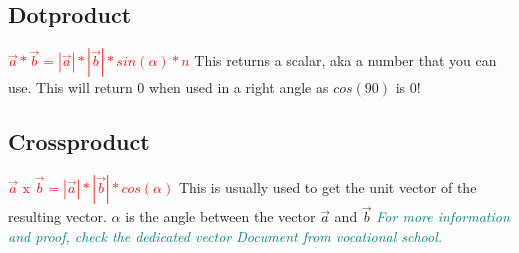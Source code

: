 \documentclass[main.tex,fontsize=8pt,paper=a4,paper=portrait,DIV=calc,]{scrartcl}
\begin{document}
\subsection{Dotproduct}
\Large{\textbf{\textcolor{red}{\( \vec{a} * \vec{b} = |\vec{a}| * |\vec{b}| * sin(\alpha) * n \)}}}\newline
\normalsize This returns a scalar, aka a number that you can use.\newline
This will return 0 when used in a right angle as \(cos(90)\) is 0!\\
\subsection{Crossproduct}
\Large{\textbf{\textcolor{red}{\( \vec{a} \text{ x } \vec{b} = |\vec{a}| * |\vec{b}| * cos(\alpha) \)}}}\newline
\normalsize This is usually used to get the unit vector of the resulting vector.\newline
\(\alpha\) is the angle between the vector \(\vec{a}\) and \(\vec{b}\)\newline
\emph{\textcolor{teal}{For more information and proof, check the dedicated vector Document from vocational school.}}\\
\begin{table}[h!]
\begin{tabular}{|m{0,2\linewidth}|m{0.755\linewidth}|}
\hline
\hline
\end{tabular}
\end{table}
\pagebreak
\end{document}
